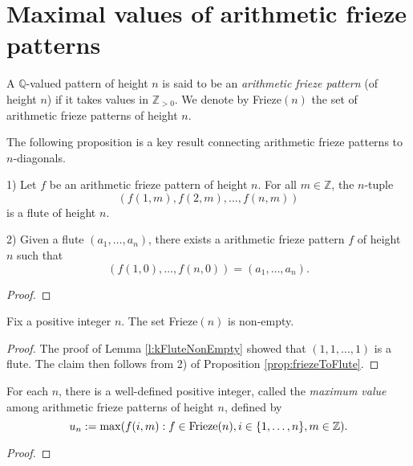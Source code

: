 \chapter{Maximal values of arithmetic frieze patterns}\label{s:arith_fp}
\begin{definition}
    \label{def:arith_fp}
        A $\mathbb{Q}$-valued pattern of height $n$ is said to be an \textit{arithmetic frieze pattern} (of height $n$) if it takes 
        values in $\mathbb{Z}_{>0}$. 
        We denote by Frieze$(n)$ the set of arithmetic frieze patterns of height $n$. 
\end{definition}

The following proposition is a key result connecting arithmetic frieze patterns to $n$-diagonals.
\begin{proposition}
    \label{prop:friezeToFlute}
1) Let $f$ be an arithmetic frieze pattern of height $n$. For all $m \in \mathbb{Z}$, the $n$-tuple
\[
    (f (1,m), f (2,m), \ldots, f (n,m))
\]
is a flute of height $n$.

2) Given a flute $(a_1, \ldots, a_n)$, there exists a arithmetic frieze pattern $f$ of height $n$ such that
\[
    (f (1,0), \ldots, f (n,0)) = (a_1, \ldots, a_n).
\]
\end{proposition}
\begin{proof}

\end{proof}

\begin{corollary}
    \label{c:friezeNonEmpty}
    Fix a positive integer $n$. The set Frieze$(n)$ is non-empty.
\end{corollary}
\begin{proof}
    The proof of Lemma \ref{l:kFluteNonEmpty} showed that $(1,1,\ldots, 1)$ is a flute. 
    The claim then follows from 2) of Proposition \ref{prop:friezeToFlute}.
\end{proof}

\begin{corollary}
    \label{l:maxDefined}
    For each $n$, there is a well-defined
    positive integer, called the {\it maximum value} among arithmetic frieze patterns of height $n$, defined by
    \[
        u_n := \max ( f (i,m) : f \in  {\rm Frieze}(n), i \in \{1,\ldots, n\}, m \in \mathbb{Z}).
    \]
\end{corollary}
\begin{proof}

\end{proof}


